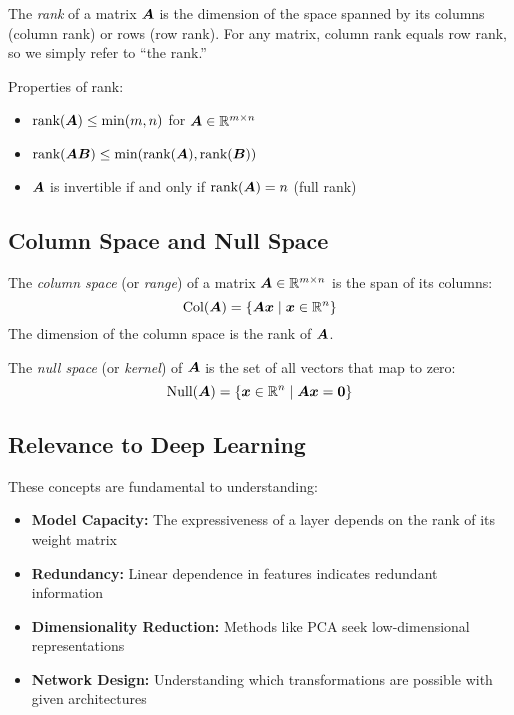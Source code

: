 \begin{definition}[Rank]
The \emph{rank} of a matrix $\boldsymbol{A}$ is the dimension of the space spanned by its columns (column rank) or rows (row rank). For any matrix, column rank equals row rank, so we simply refer to ``the rank.''
\end{definition}

Properties of rank:
\begin{itemize}
    \item $\text{rank}(\boldsymbol{A}) \leq \min(m, n)$ for $\boldsymbol{A} \in \mathbb{R}^{m \times n}$
    \item $\text{rank}(\boldsymbol{AB}) \leq \min(\text{rank}(\boldsymbol{A}), \text{rank}(\boldsymbol{B}))$
    \item $\boldsymbol{A}$ is invertible if and only if $\text{rank}(\boldsymbol{A}) = n$ (full rank)
\end{itemize}

\subsection{Column Space and Null Space}

\begin{definition}
The \emph{column space} (or \emph{range}) of a matrix $\boldsymbol{A} \in \mathbb{R}^{m \times n}$ is the span of its columns:
\begin{equation}
    \text{Col}(\boldsymbol{A}) = \{\boldsymbol{A}\boldsymbol{x} \mid \boldsymbol{x} \in \mathbb{R}^n\}
\end{equation}
The dimension of the column space is the rank of $\boldsymbol{A}$.
\end{definition}

\begin{definition}
The \emph{null space} (or \emph{kernel}) of $\boldsymbol{A}$ is the set of all vectors that map to zero:
\begin{equation}
    \text{Null}(\boldsymbol{A}) = \{\boldsymbol{x} \in \mathbb{R}^n \mid \boldsymbol{A}\boldsymbol{x} = \boldsymbol{0}\}
\end{equation}
\end{definition}

\subsection{Relevance to Deep Learning}

These concepts are fundamental to understanding:
\begin{itemize}
    \item \textbf{Model Capacity:} The expressiveness of a layer depends on the rank of its weight matrix
    \item \textbf{Redundancy:} Linear dependence in features indicates redundant information
    \item \textbf{Dimensionality Reduction:} Methods like PCA seek low-dimensional representations
    \item \textbf{Network Design:} Understanding which transformations are possible with given architectures
\end{itemize}
